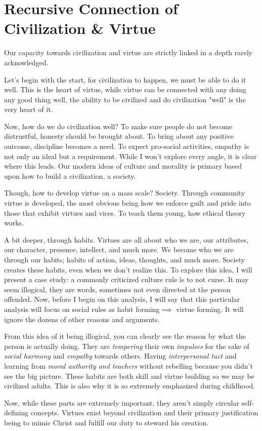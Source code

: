 \section{Recursive Connection of Civilization \& Virtue}
\par Our capacity towards civilization and virtue are strictly linked in a depth rarely acknowledged. 
\par Let's begin with the start, for civilization to happen, we must be able to do it well. This is the heart of virtue, while virtue can be connected with any doing any good thing well, the ability to be civilized and do civilization "well" is the very heart of it.
\par Now, how do we do civilization well? To make sure people do not become distrustful, honesty should be brought about. To bring about any positive outcome, discipline becomes a need. To expect pro-social activities, empathy is not only an ideal but a requirement. While I won't explore every angle, it is clear where this leads. Our modern ideas of culture and morality is primary based upon how to build a civilization, a society.
\par Though, how to develop virtue on a mass scale? Society. Through community virtue is developed, the most obvious being how we enforce guilt and pride into those that exhibit virtues and vices. To teach them young, how ethical theory works. 
\par A bit deeper, through habits. Virtues are all about who we are, our attributes, our character, presence, intellect, and much more. We become who we are through our habits; habits of action, ideas, thoughts, and much more. Society creates these habits, even when we don't realize this. To explore this idea, I will present a case study: a commonly criticized culture rule is to not curse. It may seem illogical, they are words, sometimes not even directed at the person offended. Now, before I begin on this analysis, I will say that this particular analysis will focus on social rules as habit forming$\implies$ virtue forming. It will ignore the dozens of other reasons and arguments.
\par From this idea of it being illogical, you can clearly see the reason by what the person is actually doing. They are \textit{tempering} their own \textit{impulses} for the sake of \textit{social harmony} and \textit{empathy} towards others. Having \textit{interpersonal tact} and learning from \textit{moral authority and teachers} without rebelling because you didn't see the big picture. These habits are both skill and virtue building so we may be civilized adults. This is also why it is so extremely emphasized during childhood.
\\
\par Now, while these parts are extremely important, they aren't simply circular self-defining concepts. Virtues exist beyond civilization and their primary justification being to mimic Christ and fulfill our duty to steward his creation.

